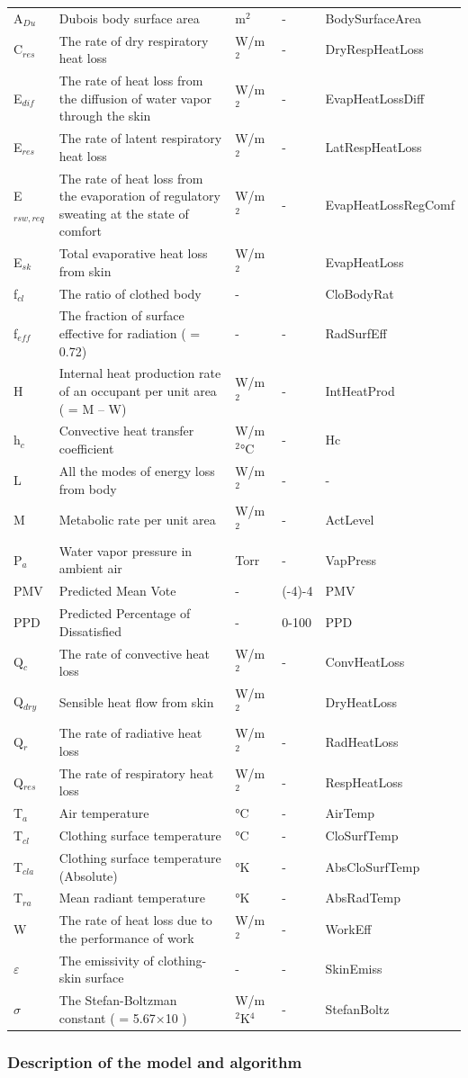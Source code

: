 \begin{longtable}[c]{p{1.2in}p{2.0in}p{0.8in}p{0.8in}p{1.2in}}
A\(_{Du}\) & Dubois body surface area & m\(^{2}\) & - & BodySurfaceArea \tabularnewline
C\(_{res}\) & The rate of dry respiratory heat loss & W/m\(^{2}\) & - & DryRespHeatLoss \tabularnewline
E\(_{dif}\) & The rate of heat loss from the diffusion of water vapor through the skin & W/m\(^{2}\) & - & EvapHeatLossDiff \tabularnewline
E\(_{res}\) & The rate of latent respiratory heat loss & W/m\(^{2}\) & - & LatRespHeatLoss \tabularnewline
E\(_{rsw,req}\) & The rate of heat loss from the evaporation of regulatory sweating at the state of comfort & W/m\(^{2}\) & - & EvapHeatLossRegComf \tabularnewline
E\(_{sk}\) & Total evaporative heat loss from skin & W/m\(^{2}\) & ~ & EvapHeatLoss \tabularnewline
f\(_{cl}\) & The ratio of clothed body & - & ~ & CloBodyRat \tabularnewline
f\(_{eff}\) & The fraction of surface effective for radiation ( = 0.72) & - & - & RadSurfEff \tabularnewline
H & Internal heat production rate of an occupant per unit area ( = M – W) & W/m\(^{2}\) & - & IntHeatProd \tabularnewline
h\(_{c}\) & Convective heat transfer coefficient & W/m\(^{2}\)°C & - & Hc \tabularnewline
L & All the modes of energy loss from body & W/m\(^{2}\) & - & - \tabularnewline
M & Metabolic rate per unit area & W/m\(^{2}\) & - & ActLevel \tabularnewline
P\(_{a}\) & Water vapor pressure in ambient air & Torr & - & VapPress \tabularnewline
PMV & Predicted Mean Vote & - & (-4)-4 & PMV \tabularnewline
PPD & Predicted Percentage of Dissatisfied & - & 0-100 & PPD \tabularnewline
Q\(_{c}\) & The rate of convective heat loss & W/m\(^{2}\) & - & ConvHeatLoss \tabularnewline
Q\(_{dry}\) & Sensible heat flow from skin & W/m\(^{2}\) & ~ & DryHeatLoss \tabularnewline
Q\(_{r}\) & The rate of radiative heat loss & W/m\(^{2}\) & - & RadHeatLoss \tabularnewline
Q\(_{res}\) & The rate of respiratory heat loss & W/m\(^{2}\) & - & RespHeatLoss \tabularnewline
T\(_{a}\) & Air temperature & °C & - & AirTemp \tabularnewline
T\(_{cl}\) & Clothing surface temperature & °C & - & CloSurfTemp \tabularnewline
T\(_{cla}\) & Clothing surface temperature (Absolute) & °K & - & AbsCloSurfTemp \tabularnewline
T\(_{ra}\) & Mean radiant temperature & °K & - & AbsRadTemp \tabularnewline
W & The rate of heat loss due to the performance of work & W/m\(^{2}\) & - & WorkEff \tabularnewline
$\varepsilon$ & The emissivity of clothing-skin surface & - & - & SkinEmiss \tabularnewline
$\sigma$ & The Stefan-Boltzman constant ( = 5.67×10  ) & W/m\(^{2}\)K\(^{4}\) & - & StefanBoltz \tabularnewline
\bottomrule
\end{longtable}

\subsubsection{Description of the model and algorithm}\label{description-of-the-model-and-algorithm}

